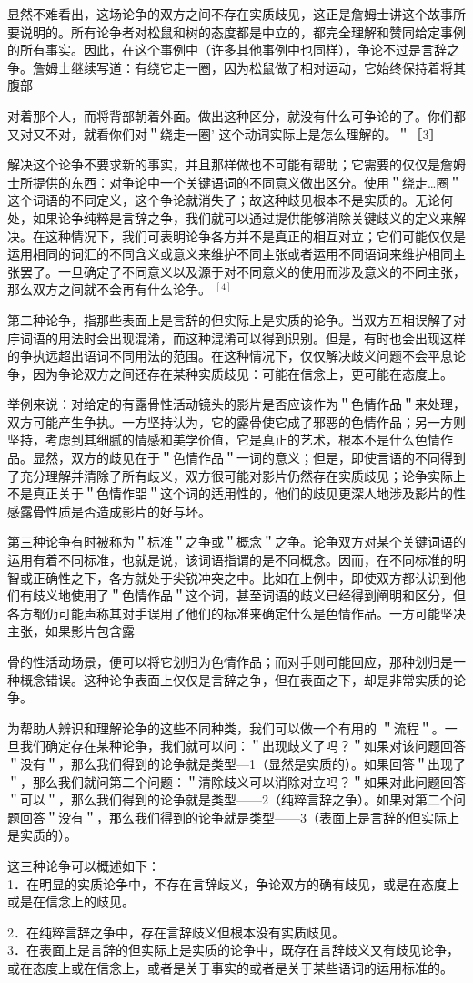 显然不难看出，这场论争的双方之间不存在实质歧见，这正是詹姆士讲这个故事所要说明的。所有论争者对松鼠和树的态度都是中立的，都完全理解和赞同给定事例的所有事实。因此，在这个事例中（许多其他事例中也同样），争论不过是言辞之争。詹姆士继续写道：有绕它走一圈，因为松鼠做了相对运动，它始终保持着将其腹部

对着那个人，而将背部朝着外面。做出这种区分，就没有什么可争论的了。你们都又对又不对，就看你们对＂绕走一圈' 这个动词实际上是怎么理解的。＂［3］

解决这个论争不要求新的事实，并且那样做也不可能有帮助；它需要的仅仅是詹姆士所提供的东西：对争论中一个关键语词的不同意义做出区分。使用＂绕走…圈＂这个词语的不同定义，这个争论就消失了；故这种歧见根本不是实质的。无论何处，如果论争纯粹是言辞之争，我们就可以通过提供能够消除关键歧义的定义来解决。在这种情况下，我们可表明论争各方并不是真正的相互对立；它们可能仅仅是运用相同的词汇的不同含义或意义来维护不同主张或者运用不同语词来维护相同主张罢了。一旦确定了不同意义以及源于对不同意义的使用而涉及意义的不同主张，那么双方之间就不会再有什么论争。 ${ }^{[4]}$

第二种论争，指那些表面上是言辞的但实际上是实质的论争。当双方互相误解了对㡰词语的用法时会出现混淆，而这种混淆可以得到识别。但是，有时也会出现这样的争执远超出语词不同用法的范围。在这种情况下，仅仅解决歧义问题不会平息论争，因为争论双方之间还存在某种实质歧见：可能在信念上，更可能在态度上。

举例来说：对给定的有露骨性活动镜头的影片是否应该作为＂色情作品＂来处理，双方可能产生争执。一方坚持认为，它的露骨使它成了邪恶的色情作品；另一方则坚持，考虑到其细腻的情感和美学价值，它是真正的艺术，根本不是什么色情作品。显然，双方的歧见在于＂色情作品＂一词的意义；但是，即使言语的不同得到了充分理解并清除了所有歧义，双方很可能对影片仍然存在实质歧见；论争实际上不是真正关于＂色情作㗊＂这个词的适用性的，他们的歧见更深人地涉及影片的性感露骨性质是否造成影片的好与坏。

第三种论争有时被称为＂标准＂之争或＂概念＂之争。论争双方对某个关键词语的运用有着不同标准，也就是说，该词语指谓的是不同概念。因而，在不同标准的明智或正确性之下，各方就处于尖锐冲突之中。比如在上例中，即使双方都认识到他们有歧义地使用了＂色情作品＂这个词，甚至词语的歧义已经得到阐明和区分，但各方都仍可能声称其对手误用了他们的标准来确定什么是色情作品。一方可能坚决主张，如果影片包含露

骨的性活动场景，便可以将它划归为色情作品；而对手则可能回应，那种划归是一种概念错误。这种论争表面上仅仅是言辞之争，但在表面之下，却是非常实质的论争。

为帮助人辨识和理解论争的这些不同种类，我们可以做一个有用的 ＂流程＂。一旦我们确定存在某种论争，我们就可以问：＂出现歧义了吗？＂如果对该问题回答＂没有＂，那么我们得到的论争就是类型—1（显然是实质的）。如果回答＂出现了＂，那么我们就问第二个问题：＂清除歧义可以消除对立吗？＂如果对此问题回答＂可以＂，那么我们得到的论争就是类型——2（纯粹言辞之争）。如果对第二个问题回答＂没有＂，那么我们得到的论争就是类型——3（表面上是言辞的但实际上是实质的）。

这三种论争可以概述如下：\\
1．在明显的实质论争中，不存在言辞歧义，争论双方的确有歧见，或是在态度上或是在信念上的歧见。

2．在纯粹言辞之争中，存在言辞歧义但根本没有实质歧见。\\
3．在表面上是言辞的但实际上是实质的论争中，既存在言辞歧义又有歧见论争，或在态度上或在信念上，或者是关于事实的或者是关于某些语词的运用标准的。 